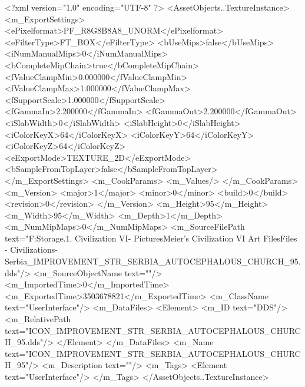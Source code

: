 <?xml version="1.0" encoding="UTF-8" ?>
<AssetObjects..TextureInstance>
	<m_ExportSettings>
		<ePixelformat>PF_R8G8B8A8_UNORM</ePixelformat>
		<eFilterType>FT_BOX</eFilterType>
		<bUseMips>false</bUseMips>
		<iNumManualMips>0</iNumManualMips>
		<bCompleteMipChain>true</bCompleteMipChain>
		<fValueClampMin>0.000000</fValueClampMin>
		<fValueClampMax>1.000000</fValueClampMax>
		<fSupportScale>1.000000</fSupportScale>
		<fGammaIn>2.200000</fGammaIn>
		<fGammaOut>2.200000</fGammaOut>
		<iSlabWidth>0</iSlabWidth>
		<iSlabHeight>0</iSlabHeight>
		<iColorKeyX>64</iColorKeyX>
		<iColorKeyY>64</iColorKeyY>
		<iColorKeyZ>64</iColorKeyZ>
		<eExportMode>TEXTURE_2D</eExportMode>
		<bSampleFromTopLayer>false</bSampleFromTopLayer>
	</m_ExportSettings>
	<m_CookParams>
		<m_Values/>
	</m_CookParams>
	<m_Version>
		<major>1</major>
		<minor>0</minor>
		<build>0</build>
		<revision>0</revision>
	</m_Version>
	<m_Height>95</m_Height>
	<m_Width>95</m_Width>
	<m_Depth>1</m_Depth>
	<m_NumMipMaps>0</m_NumMipMaps>
	<m_SourceFilePath text="F:\Mod Storage\2.1. Civilization VI\Mods\Archive - Pictures\Sid Meier's Civilization VI Art Files\Art Files - Civilizations\Civilization - Serbia\ICON_IMPROVEMENT_STR_SERBIA_AUTOCEPHALOUS_CHURCH_95.dds"/>
	<m_SourceObjectName text=""/>
	<m_ImportedTime>0</m_ImportedTime>
	<m_ExportedTime>3503678821</m_ExportedTime>
	<m_ClassName text="UserInterface"/>
	<m_DataFiles>
		<Element>
			<m_ID text="DDS"/>
			<m_RelativePath text="ICON_IMPROVEMENT_STR_SERBIA_AUTOCEPHALOUS_CHURCH_95.dds"/>
		</Element>
	</m_DataFiles>
	<m_Name text="ICON_IMPROVEMENT_STR_SERBIA_AUTOCEPHALOUS_CHURCH_95"/>
	<m_Description text=""/>
	<m_Tags>
		<Element text="UserInterface"/>
	</m_Tags>
</AssetObjects..TextureInstance>


